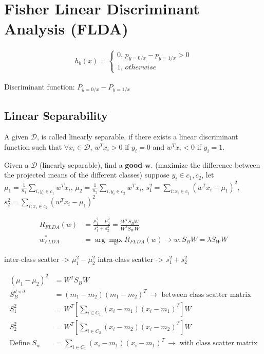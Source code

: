 \documentclass[11pt]{article}
\begin{document}
\section{Fisher Linear Discriminant Analysis (FLDA)}
\label{sec:org13d407a}

\begin{align*}
  h_b(x) = \begin{cases}
            0, \, p_{y=0/x} - p_{y=1/x} > 0 \\
            1, \, otherwise
          \end{cases}
\end{align*}

Discriminant function: \(P_{y=0/x} - P_{y=1/x}\)

\subsection{Linear Separability}
\label{sec:org58a45e0}
A given \(\mathcal{D}\), is called linearly separable, if there exists a linear discriminant function such that \(\forall x_i \in \mathcal{D}\), \(w^Tx_i>0\) if \(y_i = 0\) and \(w^Tx_i < 0\) if \(y_i = 1\).

Given a \(\mathcal{D}\) (linearly separable), find a \textbf{good} \(\mathbf{w}\). (maximize the difference between the projected means of the different classes)
suppose \(y_i \in {c_1, c_2}\), let \(\mu_1 = \frac{1}{n_1}\sum_{i, y_i \in c_1} w^Tx_i\), \(\mu_2 = \frac{1}{n_2}\sum_{i, y_i \in c_2} w^Tx_i\), \(s^2_1 = \sum_{i:x_i \in c_1} (w^Tx_i - \mu_1)^2\), \(s^2_2 = \sum_{i:x_i \in c_2} (w^Tx_i - \mu_1)^2\)

\begin{align*}
  R_{FLDA}(w) &= \frac{\mu_{1}^2 - \mu_2^2}{s^2_1 + s^2_2}  = \frac{W^T S_B W}{W^T S_W W}\\
  w^{*}_{FLDA} &= \arg \max_w R_{FLDA}(w) \rightarrow w: S_B W = \lambda S_W W
\end{align*}

inter-class scatter -> \(\mu_1^2 - \mu^2_2\)
intra-class scatter -> \(s^2_1 + s^2_2\)

\begin{align*}
  \left( \mu_1 - \mu_2 \right)^2 &= W^T S_B W \\
  S_B^{d \times d} &= (m_1 - m_2)(m_1 - m_2)^T \, \rightarrow \text{ between class scatter matrix} \\
  S_1^2 &= W^T \left[ \sum_{i \in C_1} (x_i - m_1)(x_i - m_1)^T \right] W \\
  S_2^2 &= W^T \left[ \sum_{i \in C_2} (x_i - m_2)(x_i - m_2)^T \right] W \\
\text{Define } S_w &= \sum_{i \in C_1} (x_i - m_1)(x_i - m_1)^T \, \rightarrow \text{ with class scatter matrix}
\end{align*}
\end{document}
